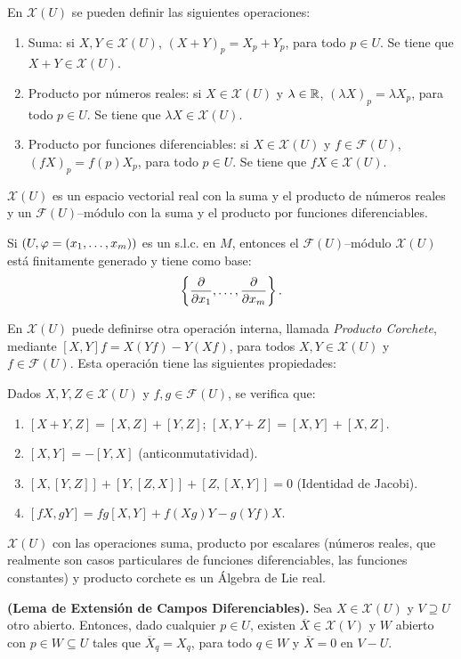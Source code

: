 \documentclass[cursovd_portada.tex]{subfiles}
\begin{document}
En $\mathcal{X}(U)$ se pueden definir las siguientes operaciones:
\begin{enumerate}
\item Suma: si $X,Y\in\mathcal{X}(U)$, $(X+Y)_p=X_p+Y_p$, para todo $p\in U$. Se tiene que $X+Y\in\mathcal{X}(U)$.
\item Producto por n\'{u}meros reales: si $X\in\mathcal{X}(U)$ y $\lambda\in\mathbb{R}$, $(\lambda X)_p=\lambda X_p$, para todo
$p\in U$. Se tiene que $\lambda X\in\mathcal{X}(U)$.
\item Producto por funciones diferenciables: si $X\in\mathcal{X}(U)$ y $f\in\mathcal{F}(U)$, $(fX)_p=f(p)X_p$, para todo
$p\in U$. Se tiene que $fX\in\mathcal{X}(U)$.
\end{enumerate}
\begin{prop} $\mathcal{X}(U)$ es un espacio vectorial real con la suma y el producto de n\'{u}meros reales y un
$\mathcal{F}(U)$--m\'{o}dulo con la suma y el producto por funciones diferenciables.
\end{prop}
\begin{prop}
Si $(U,\varphi=(x_1,\dots ,x_m))$ es un s.l.c. en $M$, entonces el $\mathcal{F}(U)$--m\'{o}dulo $\mathcal{X}(U)$ est\'{a}
finitamente generado y tiene como base:
$$\left\{\displaystyle{\frac{\partial}{\partial x_1}},\dots ,\displaystyle{\frac{\partial}{\partial x_m}}\right\}.$$
\end{prop}
En $\mathcal{X}(U)$ puede definirse otra operaci\'{o}n interna, llamada {\it Producto Corchete}, mediante
$[X,Y]f=X(Yf)-Y(Xf)$, para todos $X,Y\in\mathcal{X}(U)$ y $f\in\mathcal{F}(U)$. Esta operaci\'{o}n tiene las
siguientes propiedades:
\begin{prop}
Dados $X,Y,Z\in\mathcal{X}(U)$ y $f,g\in\mathcal{F}(U)$, se verifica que:
\begin{enumerate}
\item $[X+Y,Z]=[X,Z]+[Y,Z]$; $[X,Y+Z]=[X,Y]+[X,Z]$.
\item $[X,Y]=-[Y,X]$ (anticonmutatividad).
\item $[X,[Y,Z]]+[Y,[Z,X]]+[Z,[X,Y]]=0$ (Identidad de Jacobi).
\item $[fX,gY]=fg[X,Y]+f(Xg)Y-g(Yf)X$.
\end{enumerate}
\end{prop}
\begin{coro}
$\mathcal{X}(U)$ con las operaciones suma, producto por escalares (n\'{u}\-me\-ros reales, que realmente son casos
particulares de funciones diferenciables, las funciones constantes) y producto corchete es un \'{A}lgebra de Lie real.
\end{coro}
\begin{teorema} {\bf (Lema de Extensi\'{o}n de Campos Diferenciables).} Sea $X\in\mathcal{X}(U)$ y $V\supseteq U$ otro abierto.
Entonces, dado cualquier $p\in U$, existen $\overline{X}\in\mathcal{X}(V)$ y $W$ abierto con $p\in W\subseteq U$
tales que $\overline{X}_q=X_q$, para todo $q\in W$ y $\overline{X}=0$ en $V-U$.
\end{teorema}
\end{document}
